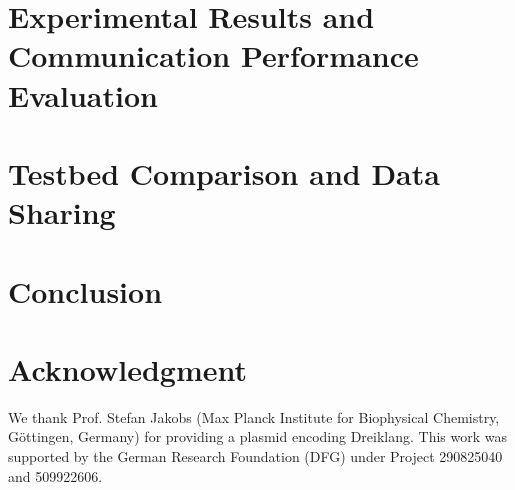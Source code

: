 \documentclass[journal, 12pt, onecolumn,draftclsnofoot, hidelinks, xcolor=dvipsnames]{IEEEtran}
\renewcommand{\baselinestretch}{1.25}
\newcommand{\scaleSection}{\vspace*{-0.35cm}}
\newcommand{\scaleSubsection}{\vspace*{-0.52cm}}
\newcommand{\scaleSectionBelow}{\vspace*{-0.1cm}}
\begin{document}
\section{Experimental Results and Communication Performance Evaluation}\label{sec:results}
\scaleSectionBelow

%
\scaleSection
\section{Testbed Comparison and Data Sharing}\label{sec:comparison_Testbeds}
\scaleSectionBelow

%
\scaleSection
\section{Conclusion}\label{sec:conclusion}
\scaleSectionBelow

%
\vspace*{-0.8cm}
\renewcommand{\baselinestretch}{1.05}


\renewcommand{\baselinestretch}{1.25}
\scaleSubsection
\section*{Acknowledgment}
\scaleSectionBelow
{\small
We thank Prof. Stefan Jakobs (Max Planck Institute for Biophysical Chemistry, Göttingen, Germany) for providing a plasmid encoding Dreiklang. This work was supported by the German Research Foundation (DFG) under Project 290825040 and 509922606.
}
\end{document}

